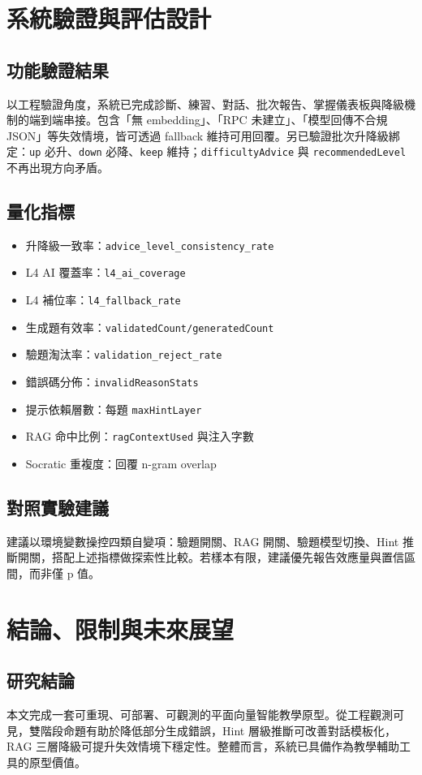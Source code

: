 \documentclass[12pt,a4paper]{article}
\begin{document}
\section{系統驗證與評估設計}
\subsection{功能驗證結果}
以工程驗證角度，系統已完成診斷、練習、對話、批次報告、掌握儀表板與降級機制的端到端串接。包含「無 embedding」、「RPC 未建立」、「模型回傳不合規 JSON」等失效情境，皆可透過 fallback 維持可用回覆。另已驗證批次升降級綁定：\texttt{up} 必升、\texttt{down} 必降、\texttt{keep} 維持；\texttt{difficultyAdvice} 與 \texttt{recommendedLevel} 不再出現方向矛盾。

\subsection{量化指標}
\begin{itemize}[leftmargin=2em]
  \item 升降級一致率：\texttt{advice\_level\_consistency\_rate}
  \item L4 AI 覆蓋率：\texttt{l4\_ai\_coverage}
  \item L4 補位率：\texttt{l4\_fallback\_rate}
  \item 生成題有效率：\texttt{validatedCount/generatedCount}
  \item 驗題淘汰率：\texttt{validation\_reject\_rate}
  \item 錯誤碼分佈：\texttt{invalidReasonStats}
  \item 提示依賴層數：每題 \texttt{maxHintLayer}
  \item RAG 命中比例：\texttt{ragContextUsed} 與注入字數
  \item Socratic 重複度：回覆 n-gram overlap
\end{itemize}

\subsection{對照實驗建議}
建議以環境變數操控四類自變項：驗題開關、RAG 開關、驗題模型切換、Hint 推斷開關，搭配上述指標做探索性比較。若樣本有限，建議優先報告效應量與置信區間，而非僅 p 值。

\section{結論、限制與未來展望}
\subsection{研究結論}
本文完成一套可重現、可部署、可觀測的平面向量智能教學原型。從工程觀測可見，雙階段命題有助於降低部分生成錯誤，Hint 層級推斷可改善對話模板化，RAG 三層降級可提升失效情境下穩定性。整體而言，系統已具備作為教學輔助工具的原型價值。
\end{document}
